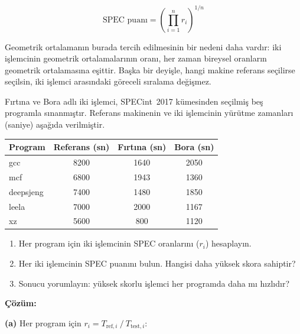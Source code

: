 \begin{equation}
\text{SPEC puanı} = \left(\prod_{i=1}^{n} r_i\right)^{1/n}
\label{eq:spec-puan}
\end{equation}

\noindent Geometrik ortalamanın burada tercih edilmesinin bir nedeni daha vardır: iki işlemcinin geometrik ortalamalarının oranı, her zaman bireysel oranların geometrik ortalamasına eşittir. Başka bir deyişle, hangi makine referans seçilirse seçilsin, iki işlemci arasındaki göreceli sıralama değişmez.

\begin{ornek}[2.9]
Fırtına ve Bora adlı iki işlemci, SPECint~2017 kümesinden seçilmiş beş programla sınanmıştır. Referans makinenin ve iki işlemcinin yürütme zamanları (saniye) aşağıda verilmiştir.

\begin{center}
\small
\begin{tabular}{lccc}
\toprule
\textbf{Program} & \textbf{Referans (sn)} & \textbf{Fırtına (sn)} & \textbf{Bora (sn)} \\
\midrule
gcc         & 8200 & 1640 & 2050 \\
mcf         & 6800 & 1943 & 1360 \\
deepsjeng   & 7400 & 1480 & 1850 \\
leela       & 7000 & 2000 & 1167 \\
xz          & 5600 & 800  & 1120 \\
\bottomrule
\end{tabular}
\end{center}

\begin{enumerate}[label=(\alph*)]
\item Her program için iki işlemcinin SPEC oranlarını ($r_i$) hesaplayın.
\item Her iki işlemcinin SPEC puanını bulun. Hangisi daha yüksek skora sahiptir?
\item Sonucu yorumlayın: yüksek skorlu işlemci her programda daha mı hızlıdır?
\end{enumerate}

\textbf{Çözüm:}

\textbf{(a)} Her program için $r_i = T_{\text{ref},i} \mathbin{/} T_{\text{test},i}$:


\end{ornek}
